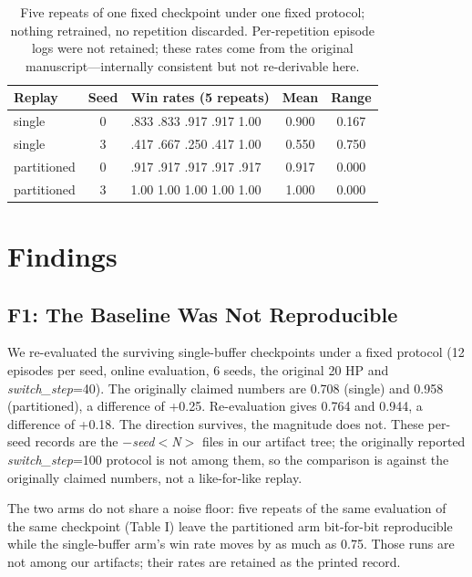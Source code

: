 \documentclass[conference,9pt]{IEEEtran}
\begin{document}
\begin{table}[!t]
\centering
\caption{Five repeats of one fixed checkpoint under one fixed protocol; nothing retrained, no repetition discarded. Per-repetition episode logs were not retained; these rates come from the original manuscript---internally consistent but not re-derivable here.}
\scriptsize
\setlength{\tabcolsep}{2pt}
\begin{tabular}{@{}l c l c c@{}}
\toprule
\textbf{Replay} & \textbf{Seed} & \textbf{Win rates (5 repeats)} & \textbf{Mean} & \textbf{Range} \\
\midrule
single & 0 & .833 .833 .917 .917 1.00 & 0.900 & 0.167 \\
single & 3 & .417 .667 .250 .417 1.00 & 0.550 & 0.750 \\
partitioned & 0 & .917 .917 .917 .917 .917 & 0.917 & 0.000 \\
partitioned & 3 & 1.00 1.00 1.00 1.00 1.00 & 1.000 & 0.000 \\
\bottomrule
\end{tabular}
\end{table}

\section{Findings}

\subsection{F1: The Baseline Was Not Reproducible}

We re-evaluated the surviving single-buffer checkpoints under a fixed protocol (12 episodes per seed, online evaluation, 6 seeds, the original 20 HP and \textit{switch\_step}=40). The originally claimed numbers are 0.708 (single) and 0.958 (partitioned), a difference of +0.25. Re-evaluation gives 0.764 and 0.944, a difference of +0.18. The direction survives, the magnitude does not. These per-seed records are the \textit{$-$seed$<$N$>$} files in our artifact tree; the originally reported \textit{switch\_step}=100 protocol is not among them, so the comparison is against the originally claimed numbers, not a like-for-like replay.

The two arms do not share a noise floor: five repeats of the same evaluation of the same checkpoint (Table I) leave the partitioned arm bit-for-bit reproducible while the single-buffer arm's win rate moves by as much as 0.75. Those runs are not among our artifacts; their rates are retained as the printed record.
\end{document}

